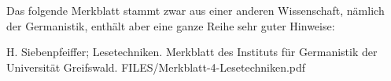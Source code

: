 

Das folgende Merkblatt stammt zwar aus einer anderen Wissenschaft, näm\-lich der Germanistik, 
enthält aber eine ganze Reihe sehr guter Hinweise:


{H. Siebenpfeiffer; Lesetechniken. Merkblatt des Instituts für Germanistik der Universität Greifswald.}
{FILES/Merkblatt-4-Lesetechniken.pdf}
{\href{https://germanistik.uni-greifswald.de/storages/uni-greifswald/fakultaet/phil/germanistik/Mitarbeitende/Siebenpfeiffer/Merkblatt__4_Lesetechniken.pdf}{\online}}









